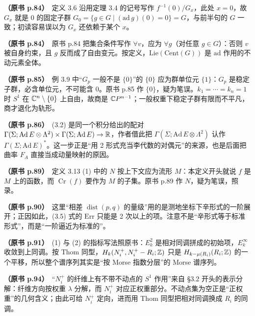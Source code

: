 \noindent \textbf{（原书 p.84）}\ 定义 3.6 沿用定理 3.4 的记号写作 $f^{-1}(0)/G_x$，此处 $x=0$，故 $G_x$ 就是 $0$ 的固定子群 $G_0=\{g\in G\mid (\mathrm{ad}\,g)(0)=0\}=G$，与前半句的 $G$ 一致；初读容易误以为 $G_x$ 还依赖于某个 $x$。\par\smallskip

\noindent \textbf{（原书 p.84）}\ 原书 p.84 把集合条件写作 $\forall v$，应为 $\forall g$（对任意 $g\in G$）：否则 $v$ 被自身约束，且 $g$ 反而成了自由变元。按定义，$\mathrm{Lie}(\mathrm{Cent}(G))$ 是 $\mathrm{ad}$ 作用的不动元素全体。\par\smallskip

\noindent \textbf{（原书 p.85）}\ 例 3.9 中“$G_p$ 一般不是 $\{0\}$”的 $\{0\}$ 应为群单位元 $\{1\}$：$G_p$ 是稳定子群，必含单位元，不可能含 $0$。原书 p.85 作 $\{0\}$，疑为笔误。$k_1=\cdots=k_n=1$ 时 $S^1$ 在 $\mathbb{C}^n\setminus\{0\}$ 上自由，故商是 $\mathbb{C}P^{n-1}$；一般权重下稳定子群有限而不平凡，商才退化为轨形。\par\smallskip

\noindent \textbf{（原书 p.86）}\ (3.2) 是同一个积分给出的配对 $\Gamma(\Sigma;\mathrm{Ad}\,E\otimes\Lambda^2)\times\Gamma(\Sigma;\mathrm{Ad}\,E)\to\mathbb{R}$，作者借此把 $\Gamma(\Sigma;\mathrm{Ad}\,E\otimes\Lambda^2)$ 认作 $\Gamma(\Sigma;\mathrm{Ad}\,E)^*$。这一步正是“用 2 形式充当李代数的对偶元”的来源，也是后面把曲率 $F_A$ 直接当成动量映射的原因。\par\smallskip

\noindent \textbf{（原书 p.89）}\ 定义 3.13 (1) 中的 $N$ 按上下文应为流形 $M$：本定义开头就说 $f$ 是 $M$ 上的函数，而 $\operatorname{Cr}(f)$ 要作为 $M$ 的子集。原书 p.89 作 $N$，疑为笔误，照录。\par\smallskip

\noindent \textbf{（原书 p.90）}\ 这里“相差 $\operatorname{dist}(p,q)$ 的量级”用的是测地坐标下辛形式的一阶展开；正因如此，(3.5) 式的 $\mathrm{Err}$ 只能是 2 次以上的项。注意不是“辛形式等于标准形式”，而是“一阶逼近为标准的”。\par\smallskip

\noindent \textbf{（原书 p.91）}\ (1) 与 (2) 的指标写法照原书：$E^2_k$ 是相对同调拼成的初始项，$E^\infty_k$ 收敛到上同调。按 Thom 同型，$H_k(N_i^+,N_i^+-R_i;\mathbb{Z})$ 只是 $H_{k-\mu(R_i)}(R_i;\mathbb{Z})$ 的一个平移，所以整个谱序列其实是“按 Morse 指数分层”的 Morse 谱序列。\par\smallskip

\noindent \textbf{（原书 p.94）}\ “$N_i^{+}$ 的纤维上有不带不动点的 $S^1$ 作用”来自 §3.2 开头的表示分解：纤维方向按权重 $\lambda$ 分解，而 $N_i^{+}$ 对应正权重部分。不动点集为空正是“正权重”的几何含义；由此可给 $N_i^{+}$ 定向，进而用 Thom 同型把相对同调换成 $R_i$ 的同调。\par\smallskip

